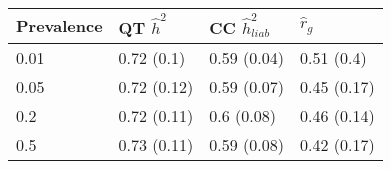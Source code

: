 \begin{table}[ht]
\centering
\begin{tabular}{llll}
  \hline
Prevalence & QT $\hat{h}^2$ & CC $\hat{h}^2_{liab}$ & $\hat{r}_g$ \\ 
  \hline
0.01 & 0.72 (0.1) & 0.59 (0.04) & 0.51 (0.4) \\ 
  0.05 & 0.72 (0.12) & 0.59 (0.07) & 0.45 (0.17) \\ 
  0.2 & 0.72 (0.11) & 0.6 (0.08) & 0.46 (0.14) \\ 
  0.5 & 0.73 (0.11) & 0.59 (0.08) & 0.42 (0.17) \\ 
   \hline
\end{tabular}
\end{table}
